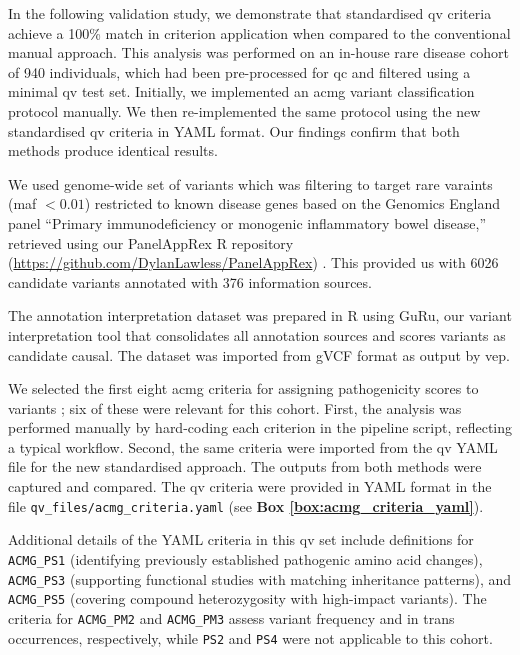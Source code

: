 In the following validation study, we demonstrate that standardised \ac{qv} criteria achieve a 100\% match in criterion application when compared to the conventional manual approach. This analysis was performed on an in-house rare disease cohort of 940 individuals, which had been pre-processed for \ac{qc} and filtered using a minimal \ac{qv} test set.
Initially, we implemented an \ac{acmg} variant classification protocol \cite{richards2015standards} manually. We then re-implemented the same protocol using the new standardised \ac{qv} criteria in YAML format. Our findings confirm that both methods produce identical results.

We used genome-wide set of variants which was filtering to target rare varaints (\ac{maf} $< 0.01$) restricted to known disease genes based on the Genomics England panel ``Primary immunodeficiency or monogenic inflammatory bowel disease,'' retrieved using our PanelAppRex R repository (\url{https://github.com/DylanLawless/PanelAppRex}) 
\cite{lawless_panelapprex_2025}. 
This provided us with 6026 candidate variants annotated with 376 information sources.

The annotation interpretation dataset was prepared in R using GuRu, our variant interpretation tool that consolidates all annotation sources and scores variants as candidate causal. The dataset was imported from gVCF format as output by \ac{vep}.

We selected the first eight \ac{acmg} criteria for assigning pathogenicity scores to variants \cite{richards2015standards}; six of these were relevant for this cohort. First, the analysis was performed manually by hard-coding each criterion in the pipeline script, reflecting a typical workflow. Second, the same criteria were imported from the \ac{qv} YAML file for the new standardised approach. The outputs from both methods were captured and compared.
The \ac{qv} criteria were provided in YAML format in the file \texttt{qv\_files/acmg\_criteria.yaml} 
(see \textbf{Box \ref{box:acmg_criteria_yaml}}).

Additional details of the YAML criteria in this \ac{qv} set include definitions for \texttt{ACMG\_PS1} (identifying previously established pathogenic amino acid changes), \texttt{ACMG\_PS3} (supporting functional studies with matching inheritance patterns), and \texttt{ACMG\_PS5} (covering compound heterozygosity with high-impact variants). The criteria for \texttt{ACMG\_PM2} and \texttt{ACMG\_PM3} assess variant frequency and in trans occurrences, respectively, while \texttt{PS2} and \texttt{PS4} were not applicable to this cohort.

